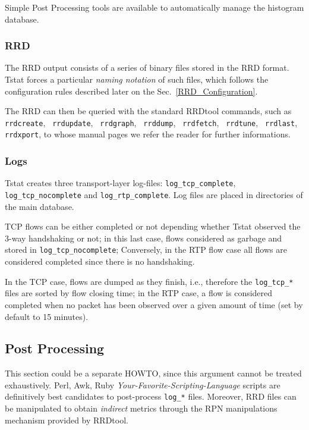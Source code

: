 \documentclass[11pt]{article}
\begin{document}
Simple \textsf{Post Processing} tools are available to automatically manage the histogram
database.

\subsubsection{RRD\label{RRD}}


The RRD output consists of a series of binary files stored in the RRD format.
Tstat forces a particular \textit{naming notation} of such files, which follows
the configuration rules described later on the Sec.~\ref{RRD_Configuration}.



The RRD can then be queried with the standard RRDtool commands, such as
\texttt{rrdcreate}, \texttt{ rrdupdate},  \texttt{ rrdgraph}, \texttt{ rrddump}, \texttt{ rrdfetch}, 
\texttt{ rrdtune}, \texttt{ rrdlast}, \texttt{ rrdxport}, to whose manual pages we refer 
the reader for further informations.

\subsubsection{Logs\label{Logs}}


Tstat creates three transport-layer log-files: \texttt{log\_tcp\_complete},
\texttt{log\_tcp\_nocomplete} and \texttt{log\_rtp\_complete}. 
Log files are placed in directories of the main database.



TCP flows can be either completed or not depending whether
Tstat observed the 3-way handshaking or not; in this last case, 
flows  considered as garbage and stored in \texttt{log\_tcp\_nocomplete};
Conversely, in the RTP flow case all flows are considered completed 
since there is no handshaking.



In the TCP case, flows are dumped as they finish, i.e., therefore the 
\texttt{log\_tcp\_*} files are sorted by flow closing time; in the RTP case,
a flow is considered completed when no packet has been observed over
a given amount of time (set by default to 15 minutes).

\subsection{Post Processing\label{Post_Processing}}


This section could be a separate HOWTO, since this
argument cannot be treated exhaustively. Perl, Awk, Ruby
\textit{Your-Favorite-Scripting-Language} scripts are definitively
best candidates to post-process \texttt{log\_*} files.
Moreover, RRD files can be manipulated to obtain \textit{indirect} 
metrics through the RPN manipulations mechanism provided 
by RRDtool.
\end{document}
